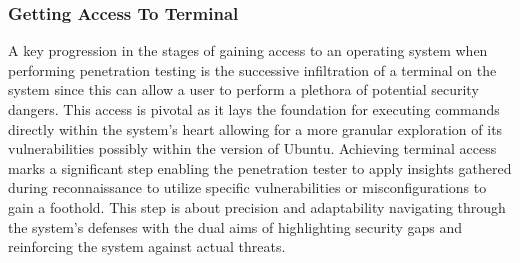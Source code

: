 \documentclass[manuscript,acmsmall,anonymous,review,screen,nonacm=true, authorversion=true]{acmart}
\begin{document}
\subsubsection{ Getting Access To Terminal}
A key progression in the stages of gaining access to an operating system when
performing penetration testing is the successive infiltration of a terminal on the system since this
can allow a user to perform a plethora of potential security dangers. This access is
pivotal as it lays the foundation for executing commands directly within the system's heart
allowing for a more granular exploration of its vulnerabilities possibly within the version of
Ubuntu. Achieving terminal access marks a significant step enabling the
penetration tester to apply insights gathered during reconnaissance to utilize specific
vulnerabilities or misconfigurations to gain a foothold. This step is about
precision and adaptability navigating through the system's defenses with the dual aims of
highlighting security gaps and reinforcing the system against actual threats.
\end{document}
